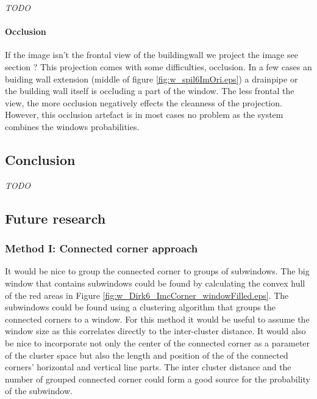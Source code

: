 \emph{TODO}\\

\paragraph{Occlusion}
\label{lab:occlusion}
If the image isn't the frontal view of the buildingwall we project the image 
see section ?%
This projection comes with some difficulties, occlusion.  In a few cases an
buiding wall extension (middle of figure \ref{fig:w_spil6ImOri.eps}) a drainpipe
or the building wall itself is occluding a part of the window.  The less frontal
the view, the more occlusion negatively effects the cleanness of the projection.
However, this occlusion artefact is in most cases no problem as the system
combines the windows probabilities.  

\subsection{Conclusion}
\emph{TODO}

\subsection{Future research}
\subsubsection{Method I: Connected corner approach} 

It would be nice to group the connected corner to groups of subwindows.
The big window that contains subwindows could be found by calculating the convex hull of the red areas in 
Figure \ref{fig:w_Dirk6_ImcCorner_windowFilled.eps}.
The subwindows could be found using a clustering algorithm that groups the connected corners to
a window. For this method it would be useful to assume the window size as this
correlates directly to the inter-cluster distance.
It would also be nice to incorporate not only the center of the connected corner
as a parameter of the cluster space but also the length and position of the of
the connected corners' horizontal and vertical line parts.  The inter cluster
distance and the number of grouped connected corner could form a good source for
the probability of the subwindow.\\

